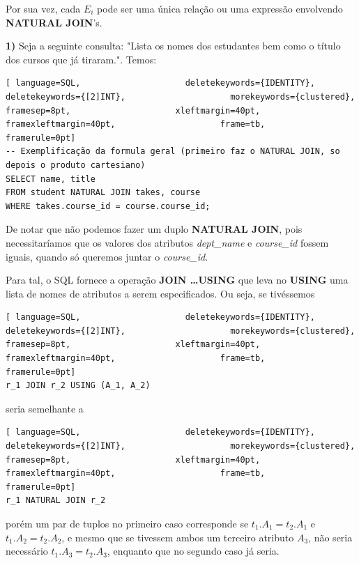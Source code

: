 \documentclass[titlepage]{book}
\theoremstyle{definition}
\begin{document}
Por sua vez, cada $E_i$ pode ser uma única relação ou uma expressão envolvendo \textbf{NATURAL JOIN}'s.

\textbf{1)} Seja a seguinte consulta: "Lista os nomes dos estudantes bem como o título dos cursos que já tiraram.". Temos:
\begin{lstlisting}[ language=SQL,                     deletekeywords={IDENTITY},                     deletekeywords={[2]INT},                     morekeywords={clustered},                     framesep=8pt,                     xleftmargin=40pt,                     framexleftmargin=40pt,                     frame=tb,                     framerule=0pt]
-- Exemplificação da formula geral (primeiro faz o NATURAL JOIN, so depois o produto cartesiano)
SELECT name, title
FROM student NATURAL JOIN takes, course
WHERE takes.course_id = course.course_id;
\end{lstlisting}

De notar que não podemos fazer um duplo \textbf{NATURAL JOIN}, pois necessitaríamos que os valores dos atributos \textit{dept\_name} e \textit{course\_id} fossem iguais, quando só queremos juntar o \textit{course\_id}. 

Para tal, o SQL fornece a operação \textbf{JOIN \dots USING} que leva no \textbf{USING} uma lista de nomes de atributos a serem especificados. Ou seja, se tivéssemos 
\begin{lstlisting}[ language=SQL,                     deletekeywords={IDENTITY},                     deletekeywords={[2]INT},                     morekeywords={clustered},                     framesep=8pt,                     xleftmargin=40pt,                     framexleftmargin=40pt,                     frame=tb,                     framerule=0pt]
r_1 JOIN r_2 USING (A_1, A_2)
\end{lstlisting}
seria semelhante a 
\begin{lstlisting}[ language=SQL,                     deletekeywords={IDENTITY},                     deletekeywords={[2]INT},                     morekeywords={clustered},                     framesep=8pt,                     xleftmargin=40pt,                     framexleftmargin=40pt,                     frame=tb,                     framerule=0pt]
r_1 NATURAL JOIN r_2
\end{lstlisting}
porém um par de tuplos no primeiro caso corresponde se $t_1.A_1 = t_2.A_1$ e $t_1.A_2 = t_2.A_2$, e mesmo que se tivessem ambos um terceiro atributo $A_3$, não seria necessário $t_1.A_3 = t_2.A_3$, enquanto que no segundo caso já seria.
\end{document}
